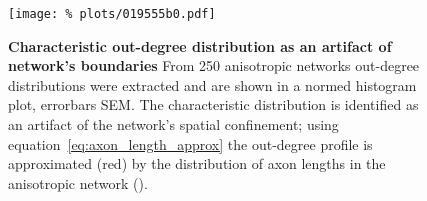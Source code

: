 \begin{figure}[H]
  \centering
  \texttt{[image: \%
    plots/019555b0.pdf]}
  \caption{\textbf{Characteristic out-degree distribution as an
      artifact of network's boundaries} From 250 anisotropic networks
    out-degree distributions were extracted and are shown in a normed
    histogram plot, errorbars SEM. The characteristic distribution is
    identified as an artifact of the network's spatial confinement;
    using equation~\ref{eq:axon_length_approx} the out-degree profile
    is approximated (red) by the distribution of axon lengths in the
    anisotropic network ().}
  \label{fig:out_degree_ER_compare}
\end{figure}



